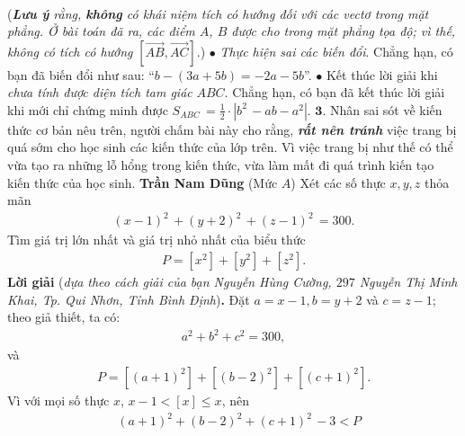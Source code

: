 \begin{multicols}{2}
\begin{align*}
	\end{align*}
	(\textit{\textbf{\color{thachthuctoanhoc}Lưu ý} rằng, \textbf{\color{thachthuctoanhoc}không} có khái niệm tích có hướng đối với các vectơ trong mặt phẳng. Ở bài toán đã ra, các điểm $A$, $B$ được cho trong mặt phẳng tọa độ; vì thế, không có tích có hướng}  $\left[ {\overrightarrow {AB} ,\overrightarrow {AC} } \right]$.)
	\vskip 0.05cm
	$\bullet$ \textit{Thực hiện sai các biến đổi}. Chẳng hạn, có bạn đã biến đổi như sau: “$b - (3a + 5b) = -2a - 5b$”.
	\vskip 0.05cm
	$\bullet$ Kết thúc lời giải khi \textit{chưa tính được diện tích tam giác} $ABC$. Chẳng hạn, có bạn đã kết thúc lời giải khi mới chỉ chứng minh được ${S_{ABC}}\, = \frac{1}{2} \cdot \left| {{b^2}\, - ab - {a^2}} \right|$.
	\vskip 0.05cm
	$\pmb{3.}$ Nhân sai sót về kiến thức cơ bản nêu trên, người chấm bài này cho rằng, \textbf{\textit{\color{thachthuctoanhoc}rất nên tránh}} việc trang bị quá sớm cho học sinh các kiến thức của lớp trên. Vì việc trang bị như thế có thể vừa tạo ra những lỗ hổng trong kiến thức, vừa làm mất đi quá trình kiến tạo kiến thức của học sinh.
	\vskip 0.05cm
		\hfill \textbf{\color{thachthuctoanhoc}Trần Nam Dũng}
	\vskip 0.05cm
	{}
	(Mức $A$) Xét các số thực $x, y, z$ thỏa mãn
	\begin{align*}
		{\left( {x - 1} \right)^2}\, + {\left( {y + 2} \right)^2}\, + {\left( {z - 1} \right)^2}\, = 300.
	\end{align*}
	Tìm giá trị lớn nhất và giá trị nhỏ nhất của biểu thức
	\begin{align*}
		P = \left[ {{x^2}} \right] + \left[ {{y^2}} \right] + \left[ {{z^2}} \right].
	\end{align*}
	\textbf{\color{thachthuctoanhoc}Lời giải} (\textit{dựa theo cách giải của bạn Nguyễn Hùng Cường, $297$ Nguyễn Thị Minh Khai, Tp. Qui Nhơn, Tỉnh Bình Định})\textbf{\color{thachthuctoanhoc}.}
	\vskip 0.05cm
	Đặt $a=x - 1, b=y+ 2$ và $c=z - 1$; theo giả thiết, ta có:
	\begin{align*}
		a^2 + b^2 + c^2 = 300, \tag{$1$}
	\end{align*}
	và
	\begin{align*}
		P = \left[ {{{\left( {a + 1} \right)}^2}} \right] + \left[ {{{\left( {b - 2} \right)}^2}} \right] + \left[ {{{\left( {c + 1} \right)}^2}} \right].
	\end{align*}
	Vì với mọi số thực $x$, $x - 1 < [x]  \le x$, nên
	\begin{align*}
		&{\left( {a + 1} \right)^2} + {\left( {b - 2} \right)^2} + {\left( {c + 1} \right)^2}\, - 3 < P \\

\end{align*}
\end{multicols}
